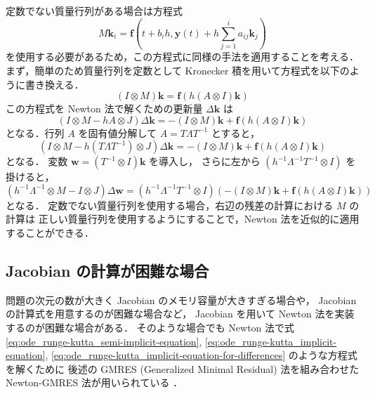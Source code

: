 定数でない質量行列がある場合は方程式
\begin{equation}
    M \bm{k}_i = \bm{f}\left(t + b_i h, \bm{y}(t) + h \sum_{j = 1}^i a_{ij} \bm{k}_j \right)
\end{equation}
を使用する必要があるため，この方程式に同様の手法を適用することを考える．
まず，簡単のため質量行列を定数として Kronecker 積を用いて方程式を以下のように書き換える．
\begin{equation}
    (I \otimes M) \bm{k} = \bm{f}\left(h (A \otimes I) \bm{k}\right)
\end{equation}
この方程式を Newton 法で解くための更新量 $\Delta \bm{k}$ は
\begin{equation}
    (I \otimes M - h A \otimes J) \Delta \bm{k} = -(I \otimes M) \bm{k} + \bm{f}\left(h (A \otimes I) \bm{k}\right)
\end{equation}
となる．行列 $A$ を固有値分解して
$A = T \Lambda T^{-1}$
とすると，
\begin{equation}
    (I \otimes M - h (T \Lambda T^{-1}) \otimes J) \Delta \bm{k}
    = -(I \otimes M) \bm{k} + \bm{f}\left(h (A \otimes I) \bm{k}\right)
\end{equation}
となる．
変数 $\bm{w} = (T^{-1} \otimes I) \bm{k}$ を導入し，
さらに左から $(h^{-1} \Lambda^{-1} T^{-1} \otimes I)$ を掛けると，
\begin{equation}
    (h^{-1} \Lambda^{-1} \otimes M - I \otimes J) \Delta \bm{w}
    = (h^{-1} \Lambda^{-1} T^{-1} \otimes I)
    \left(-(I \otimes M) \bm{k} + \bm{f}\left(h (A \otimes I) \bm{k}\right) \right)
\end{equation}
となる．
定数でない質量行列を使用する場合，右辺の残差の計算における $M$ の計算は
正しい質量行列を使用するようにすることで，Newton 法を近似的に適用することができる．

\subsection{Jacobian の計算が困難な場合}\label{sec:ode_runge-kutta_without-jacobian}

問題の次元の数が大きく Jacobian のメモリ容量が大きすぎる場合や，
Jacobian の計算式を用意するのが困難な場合など，
Jacobian を用いて Newton 法を実装するのが困難な場合がある．
そのような場合でも Newton 法で式
\eqref{eq:ode_runge-kutta_semi-implicit-equation},
\eqref{eq:ode_runge-kutta_implicit-equation},
\eqref{eq:ode_runge-kutta_implicit-equation-for-differences}
のような方程式を解くために
後述の GMRES (Generalized Minimal Residual)  法を組み合わせた
Newton-GMRES 法が用いられている
\cite{Blom2016, Blom2013}．

